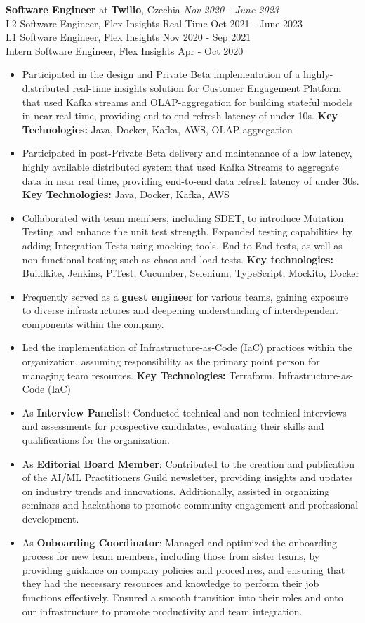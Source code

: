 {\textbf{Software Engineer} at \textbf{Twilio}, Czechia} 
    \hfill {\em Nov 2020 - June 2023}\\
    {L2 Software Engineer, Flex Insights Real-Time} \hfill  {Oct 2021 - June 2023}\\
    {L1 Software Engineer, Flex Insights} \hfill            {Nov 2020 - Sep 2021}\\
    {Intern Software Engineer, Flex Insights} \hfill        {Apr - Oct 2020}
    \begin{itemize}
        \item Participated in the design and Private Beta implementation of a highly-distributed real-time insights solution for Customer Engagement Platform that used Kafka streams and OLAP-aggregation for building stateful models in near real time, providing end-to-end refresh latency of under 10s. \textbf{Key Technologies:} Java, Docker, Kafka, AWS, OLAP-aggregation
        \item Participated in post-Private Beta delivery and maintenance of a low latency, highly available distributed system that used Kafka Streams to aggregate data in near real time, providing end-to-end data refresh latency of under 30s. \textbf{Key Technologies:} Java, Docker, Kafka, AWS
        \item Collaborated with team members, including SDET, to introduce Mutation Testing and enhance the unit test strength. Expanded testing capabilities by adding Integration Tests using mocking tools, End-to-End tests, as well as non-functional testing such as chaos and load tests. \textbf{Key technologies:} Buildkite, Jenkins, PiTest, Cucumber, Selenium, TypeScript, Mockito, Docker
        \item Frequently served as a \textbf{guest engineer} for various teams, gaining exposure to diverse infrastructures and deepening understanding of interdependent components within the company.
        \item Led the implementation of Infrastructure-as-Code (IaC) practices within the organization, assuming responsibility as the primary point person for managing team resources. \textbf{Key Technologies:} Terraform, Infrastructure-as-Code (IaC)
        \item As \textbf{Interview Panelist}: Conducted technical and non-technical interviews and assessments for prospective candidates, evaluating their skills and qualifications for the organization.
        \item As \textbf{Editorial Board Member}: Contributed to the creation and publication of the AI/ML Practitioners Guild newsletter, providing insights and updates on industry trends and innovations. Additionally, assisted in organizing seminars and hackathons to promote community engagement and professional development.
        \item As \textbf{Onboarding Coordinator}: Managed and optimized the onboarding process for new team members, including those from sister teams, by providing guidance on company policies and procedures, and ensuring that they had the necessary resources and knowledge to perform their job functions effectively. Ensured a smooth transition into their roles and onto our infrastructure to promote productivity and team integration.
    \end{itemize}